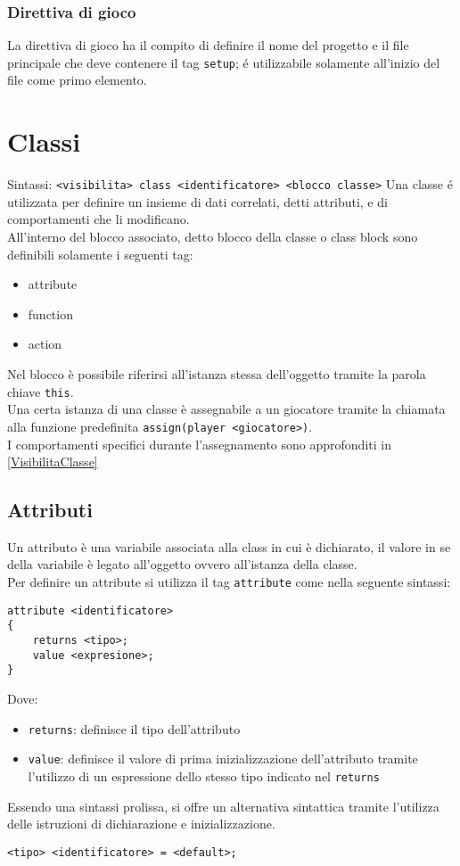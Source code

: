 \subsubsection{Direttiva di gioco}
La direttiva di gioco ha il compito di definire il nome del progetto e il file principale
che deve contenere il tag \lstinline|setup|; é utilizzabile solamente all'inizio del file 
come primo elemento. \\


\section{Classi}
Sintassi: \lstinline|<visibilita> class <identificatore> <blocco classe>|
Una classe é utilizzata per definire un insieme di dati correlati, detti attributi, e di 
comportamenti che li modificano. \\
All'interno del blocco associato, detto blocco della classe o class block sono definibili
solamente i seguenti tag:
\begin{itemize}
    \item attribute
    \item function
    \item action
\end{itemize}
Nel blocco è possibile riferirsi all'istanza stessa dell'oggetto tramite la parola chiave \lstinline|this|. \\
Una certa istanza di una classe è assegnabile a un giocatore tramite la chiamata alla funzione predefinita \lstinline|assign(player <giocatore>)|. \\
I comportamenti specifici durante l'assegnamento sono approfonditi in \ref*{VisibilitaClasse}

\subsection{Attributi}
Un attributo è una variabile associata alla class in cui è dichiarato, il valore in se della 
variabile è legato all'oggetto ovvero all'istanza della classe. \\
Per definire un attribute si utilizza il tag \lstinline|attribute| come nella seguente sintassi:
\begin{lstlisting}
attribute <identificatore>
{
    returns <tipo>;     
    value <expresione>;
}
\end{lstlisting}
Dove:
\begin{itemize}
    \item \lstinline|returns|: definisce il tipo dell'attributo
    \item \lstinline|value|: definisce il valore di prima inizializzazione dell'attributo tramite 
    l'utilizzo di un espressione dello stesso tipo indicato nel \lstinline|returns|
\end{itemize}
Essendo una sintassi prolissa, si offre un alternativa sintattica tramite l'utilizza
delle istruzioni di dichiarazione e inizializzazione.
\begin{lstlisting}
<tipo> <identificatore> = <default>; 
\end{lstlisting}


